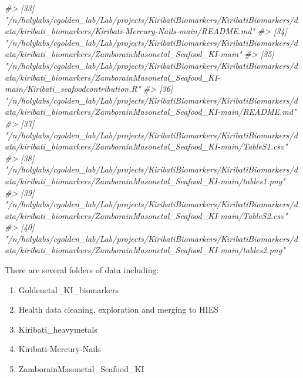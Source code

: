 \documentclass[]{article}
\newenvironment{Shaded}{\begin{snugshade}}{\end{snugshade}}
\newcommand{\CommentTok}[1]{\textcolor[rgb]{0.56,0.35,0.01}{\textit{#1}}}
\providecommand{\tightlist}{%
  \setlength{\itemsep}{0pt}\setlength{\parskip}{0pt}}
\begin{document}
\begin{Shaded}
\begin{Highlighting}[]
\CommentTok{#> [33] "/n/holylabs/cgolden_lab/Lab/projects/KiribatiBiomarkers/KiribatiBiomarkers/data/kiribati_biomarkers/Kiribati-Mercury-Nails-main/README.md"                                                                                     }
\CommentTok{#> [34] "/n/holylabs/cgolden_lab/Lab/projects/KiribatiBiomarkers/KiribatiBiomarkers/data/kiribati_biomarkers/ZamborainMasonetal_Seafood_KI-main"                                                                                        }
\CommentTok{#> [35] "/n/holylabs/cgolden_lab/Lab/projects/KiribatiBiomarkers/KiribatiBiomarkers/data/kiribati_biomarkers/ZamborainMasonetal_Seafood_KI-main/Kiribati_seafoodcontribution.R"                                                         }
\CommentTok{#> [36] "/n/holylabs/cgolden_lab/Lab/projects/KiribatiBiomarkers/KiribatiBiomarkers/data/kiribati_biomarkers/ZamborainMasonetal_Seafood_KI-main/README.md"                                                                              }
\CommentTok{#> [37] "/n/holylabs/cgolden_lab/Lab/projects/KiribatiBiomarkers/KiribatiBiomarkers/data/kiribati_biomarkers/ZamborainMasonetal_Seafood_KI-main/TableS1.csv"                                                                            }
\CommentTok{#> [38] "/n/holylabs/cgolden_lab/Lab/projects/KiribatiBiomarkers/KiribatiBiomarkers/data/kiribati_biomarkers/ZamborainMasonetal_Seafood_KI-main/tables1.png"                                                                            }
\CommentTok{#> [39] "/n/holylabs/cgolden_lab/Lab/projects/KiribatiBiomarkers/KiribatiBiomarkers/data/kiribati_biomarkers/ZamborainMasonetal_Seafood_KI-main/TableS2.csv"                                                                            }
\CommentTok{#> [40] "/n/holylabs/cgolden_lab/Lab/projects/KiribatiBiomarkers/KiribatiBiomarkers/data/kiribati_biomarkers/ZamborainMasonetal_Seafood_KI-main/tables2.png"}
\end{Highlighting}
\end{Shaded}

There are several folders of data including:

\begin{enumerate}
\def\labelenumi{\arabic{enumi}.}
\tightlist
\item
  Goldenetal\_KI\_biomarkers
\item
  Health data cleaning, exploration and merging to HIES
\item
  Kiribati\_heavymetals
\item
  Kiribati-Mercury-Nails
\item
  ZamborainMasonetal\_Seafood\_KI
\end{enumerate}
\end{document}
